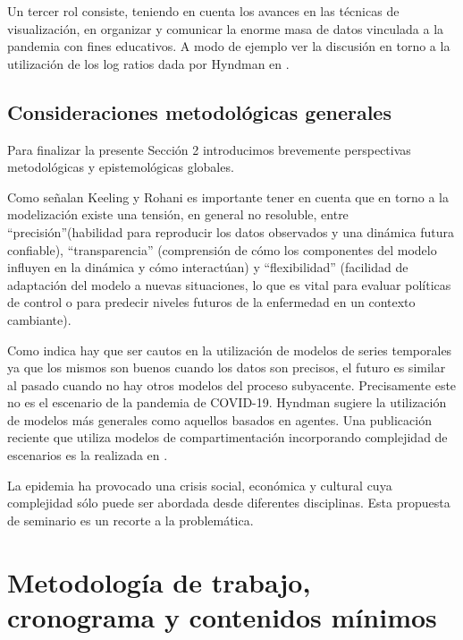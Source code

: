 \documentclass{article}
\begin{document}
Un tercer rol consiste, teniendo en cuenta los avances en las técnicas de   visualización, en organizar y comunicar la enorme masa de datos vinculada a la pandemia con fines educativos.  A modo de ejemplo ver la discusión en torno a la utilización de los log ratios dada por Hyndman en \citep{hyn2}.


 
 \subsection{Consideraciones metodológicas generales} 
  
 Para finalizar la presente Sección 2 introducimos brevemente perspectivas metodológicas y epistemológicas globales.
 
 
  Como señalan Keeling y Rohani \cite{KR}   es importante tener en cuenta que  en torno a  la modelización  existe una tensión, en general no resoluble, entre ``precisión''(habilidad para reproducir los datos observados y una dinámica futura confiable),  ``transparencia'' (comprensión de cómo los componentes del modelo influyen en la dinámica y cómo interactúan)  y  ``flexibilidad'' (facilidad de adaptación del modelo a nuevas situaciones, lo que es vital para evaluar políticas de control o para predecir niveles futuros de la enfermedad en un contexto cambiante).
 
 
 Como indica \cite{hyn1} hay que ser cautos en la utilización de modelos de series temporales ya que los mismos son buenos cuando los datos son precisos, el futuro es similar al pasado cuando no hay otros modelos del proceso subyacente. Precisamente este no es el escenario de la pandemia de COVID-19. Hyndman sugiere la utilización de modelos más generales como aquellos  basados en agentes. Una publicación reciente que utiliza modelos de compartimentación  incorporando complejidad de escenarios es la realizada en \cite{fergu2020}. 
 
 La epidemia ha provocado una crisis social, económica y cultural cuya complejidad sólo puede ser abordada desde diferentes disciplinas. Esta propuesta de seminario es un recorte a la problemática.
 
 
	
	


\section{Metodología de trabajo, cronograma y  contenidos mínimos} \label{metocrono}
\end{document}
